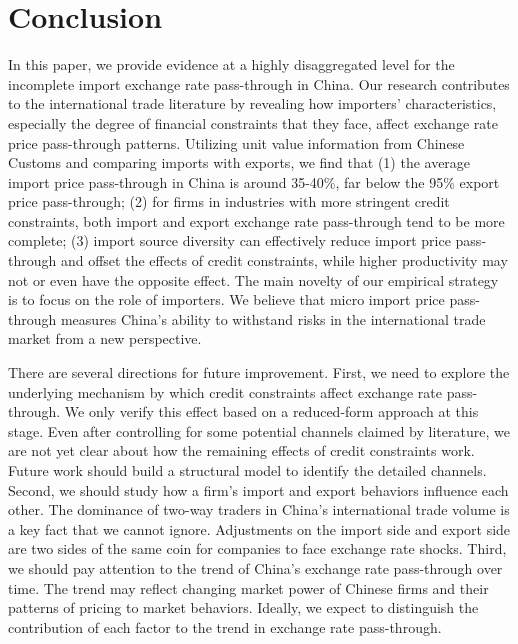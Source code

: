 \chapter{Conclusion}\label{sec-conclusion}

In this paper, we provide evidence at a highly disaggregated level for the incomplete import exchange rate pass-through in China. Our research contributes to the international trade literature by revealing how importers' characteristics, especially the degree of financial constraints that they face, affect exchange rate price pass-through patterns. Utilizing unit value information from Chinese Customs and comparing imports with exports, we find that (1) the average import price pass-through in China is around 35-40\%, far below the 95\% export price pass-through; (2) for firms in industries with more stringent credit constraints, both import and export exchange rate pass-through tend to be more complete; (3) import source diversity can effectively reduce import price pass-through and offset the effects of credit constraints, while higher productivity may not or even have the opposite effect. The main novelty of our empirical strategy is to focus on the role of importers. We believe that micro import price pass-through measures China's ability to withstand risks in the international trade market from a new perspective.

There are several directions for future improvement. First, we need to explore the underlying mechanism by which credit constraints affect exchange rate pass-through. We only verify this effect based on a reduced-form approach at this stage. Even after controlling for some potential channels claimed by literature, we are not yet clear about how the remaining effects of credit constraints work. Future work should build a structural model to identify the detailed channels. Second, we should study how a firm's import and export behaviors influence each other. The dominance of two-way traders in China's international trade volume is a key fact that we cannot ignore. Adjustments on the import side and export side are two sides of the same coin for companies to face exchange rate shocks. Third, we should pay attention to the trend of China's exchange rate pass-through over time. The trend may reflect changing market power of Chinese firms and their patterns of pricing to market behaviors. Ideally, we expect to distinguish the contribution of each factor to the trend in exchange rate pass-through. 

